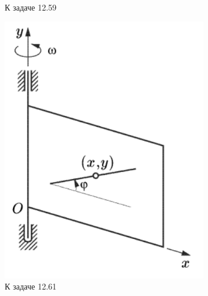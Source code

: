 \begin{figure}
\begin{minipage}[t]{0.3\textwidth}
    \caption{К задаче 12.59}
    \label{t12n59}
\end{minipage}
\hfill
\begin{minipage}[t]{0.3\textwidth}
    \centering
    \includegraphics[width=0.8\textwidth]{figures/12.61.png}
    \caption{К задаче 12.61}
    \label{t12n61}
\end{minipage}
\end{figure}











